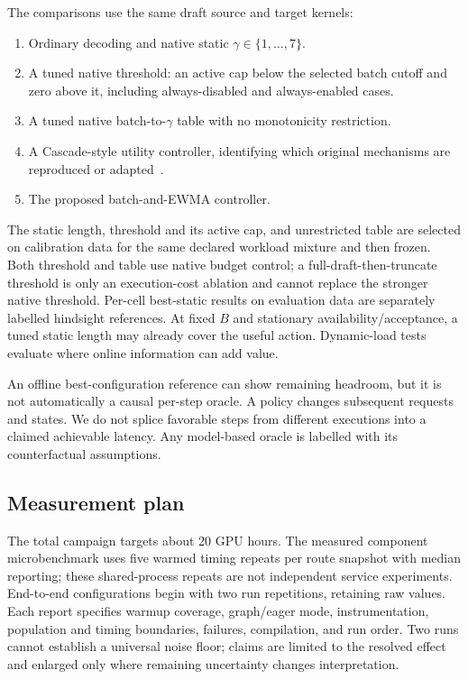 \documentclass[10pt,twocolumn]{article}
\begin{document}
The comparisons use the same draft source and target kernels:
\begin{enumerate}
\item Ordinary decoding and native static $\gamma\in\{1,\ldots,7\}$.
\item A tuned native threshold: an active cap below the selected batch cutoff and zero above it, including always-disabled and always-enabled cases.
\item A tuned native batch-to-$\gamma$ table with no monotonicity restriction.
\item A Cascade-style utility controller, identifying which original mechanisms are reproduced or adapted~\cite{cascade}.
\item The proposed batch-and-EWMA controller.
\end{enumerate}
The static length, threshold and its active cap, and unrestricted table are selected on calibration data for the same declared workload mixture and then frozen. Both threshold and table use native budget control; a full-draft-then-truncate threshold is only an execution-cost ablation and cannot replace the stronger native threshold. Per-cell best-static results on evaluation data are separately labelled hindsight references. At fixed $B$ and stationary availability/acceptance, a tuned static length may already cover the useful action. Dynamic-load tests evaluate where online information can add value.

An offline best-configuration reference can show remaining headroom, but it is not automatically a causal per-step oracle. A policy changes subsequent requests and states. We do not splice favorable steps from different executions into a claimed achievable latency. Any model-based oracle is labelled with its counterfactual assumptions.

\subsection{Measurement plan}
The total campaign targets about 20 GPU hours. The measured component microbenchmark uses five warmed timing repeats per route snapshot with median reporting; these shared-process repeats are not independent service experiments. End-to-end configurations begin with two run repetitions, retaining raw values. Each report specifies warmup coverage, graph/eager mode, instrumentation, population and timing boundaries, failures, compilation, and run order. Two runs cannot establish a universal noise floor; claims are limited to the resolved effect and enlarged only where remaining uncertainty changes interpretation.
\end{document}
